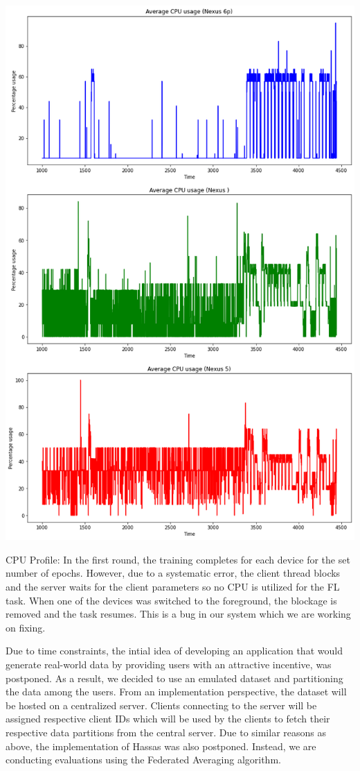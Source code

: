     \begin{table}[h]
    \includegraphics[scale=0.30]{cpuprof}
    \caption{CPU Profile: In the first round, the training completes for each device for the set number of epochs. However, due to a systematic error, the client thread blocks and the server waits for the client parameters so no CPU is utilized for the FL task. When one of the devices was switched to the foreground, the blockage is removed and the task resumes. This is a bug in our system which we are working on fixing.}
    \end{table}

    Due to time constraints, the intial idea of developing an application that would generate real-world data by providing users with an attractive incentive, was postponed. As a result, we decided to use an emulated dataset and partitioning the data among the users. From an implementation perspective, the dataset will be hosted on a centralized server. Clients connecting to the server will be assigned respective client IDs which will be used by the clients to fetch their respective data partitions from the central server. Due to similar reasons as above, the implementation of Hassas was also postponed. Instead, we are conducting evaluations using the Federated Averaging algorithm. \\

